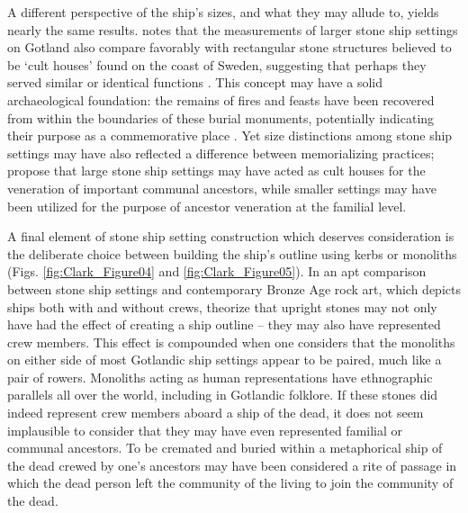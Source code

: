 A different perspective of the ship’s sizes, and what they may allude to, yields nearly the same results. \textcite{Bradley_2010} notes that the measurements of larger stone ship settings on Gotland also compare favorably with rectangular stone structures believed to be ‘cult houses’ found on the coast of Sweden,
suggesting that perhaps they served similar or identical functions \parencite[97]{Bradley_2010}.
This concept may have a solid archaeological foundation: the remains of fires and feasts have been recovered from within the boundaries of these burial monuments, potentially indicating their purpose as a commemorative place \parencite[261]{Price_2008}.
Yet size distinctions among stone ship settings may have also reflected a difference between memorializing practices; \textcite[97]{Bradley_2010} propose that large stone ship settings may have acted as cult houses for the veneration of important communal ancestors, while smaller settings may have been utilized for the purpose of ancestor veneration at the familial level.

A final element of stone ship setting construction which deserves consideration is the deliberate choice between building the ship’s outline using kerbs or monoliths (Figs. \ref{fig:Clark_Figure04} and \ref{fig:Clark_Figure05}).
In an apt comparison between stone ship settings and contemporary Bronze Age rock art, which depicts ships both with and without crews, \textcite[86--87]{Bradley_2010} theorize that upright stones may not only have had the effect of creating a ship outline -- they may also have represented crew members. This effect is compounded when one considers that the monoliths on either side of most Gotlandic ship settings appear to be paired, much like a pair of rowers. Monoliths acting as human representations have ethnographic parallels all over the world, including in Gotlandic folklore. If these stones did indeed represent crew members aboard a ship of the dead, it does not seem implausible to consider that they may have even represented familial or communal ancestors. To be cremated and buried within a metaphorical ship of the dead crewed by one’s ancestors may have been considered a rite of passage in which the dead person left the community of the living to join the community of the dead.



